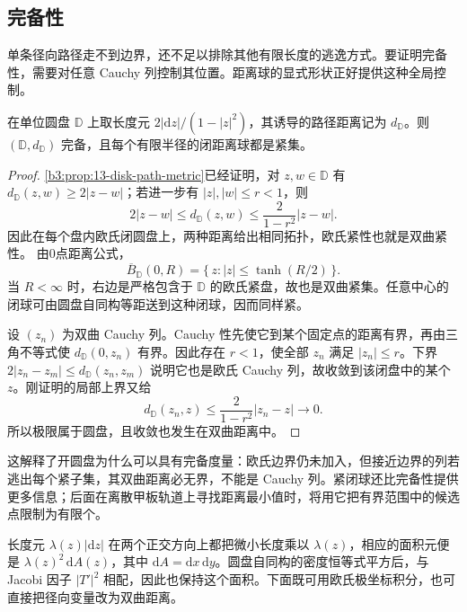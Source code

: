\subsection{完备性}
\label{b3:subsec:130202}

单条径向路径走不到边界，还不足以排除其他有限长度的逃逸方式。要证明完备性，需要对任意 Cauchy 列控制其位置。距离球的显式形状正好提供这种全局控制。

\begin{theorem}[圆盘的完备性与紧闭球]\label{b3:thm:13-disk-complete}
在单位圆盘 \(\mathbb D\) 上取长度元 \(2|\mathrm dz|/(1-|z|^2)\)，其诱导的路径距离记为 \(d_{\mathbb D}\)。则 \((\mathbb D,d_{\mathbb D})\) 完备，且每个有限半径的闭距离球都是紧集。
\end{theorem}
\begin{proof}
\cref{b3:prop:13-disk-path-metric}已经证明，对 \(z,w\in\mathbb D\) 有 \(d_{\mathbb D}(z,w)\ge2|z-w|\)；若进一步有 \(|z|,|w|\le r<1\)，则
\[
 2|z-w|\le d_{\mathbb D}(z,w)
 \le\frac{2}{1-r^2}|z-w|.
\]
因此在每个盘内欧氏闭圆盘上，两种距离给出相同拓扑，欧氏紧性也就是双曲紧性。
由0点距离公式，
\[
 \overline B_{\mathbb D}(0,R)
 =\{\,z:|z|\le\tanh(R/2)\,\}.
\]
当 \(R<\infty\) 时，右边是严格包含于 \(\mathbb D\) 的欧氏紧盘，故也是双曲紧集。任意中心的闭球可由圆盘自同构等距送到这种闭球，因而同样紧。

设 \((z_n)\) 为双曲 Cauchy 列。Cauchy 性先使它到某个固定点的距离有界，再由三角不等式使 \(d_{\mathbb D}(0,z_n)\) 有界。因此存在 \(r<1\)，使全部 \(z_n\) 满足 \(|z_n|\le r\)。下界 \(2|z_n-z_m|\le d_{\mathbb D}(z_n,z_m)\) 说明它也是欧氏 Cauchy 列，故收敛到该闭盘中的某个 \(z\)。刚证明的局部上界又给
\[
 d_{\mathbb D}(z_n,z)\le\frac{2}{1-r^2}|z_n-z|\longrightarrow0.
\]
所以极限属于圆盘，且收敛也发生在双曲距离中。
\end{proof}

这解释了开圆盘为什么可以具有完备度量：欧氏边界仍未加入，但接近边界的列若逃出每个紧子集，其双曲距离必无界，不能是 Cauchy 列。紧闭球还比完备性提供更多信息；后面在离散甲板轨道上寻找距离最小值时，将用它把有界范围中的候选点限制为有限个。

\ProseParagraphBreak
长度元 \(\lambda(z)|\mathrm dz|\) 在两个正交方向上都把微小长度乘以 \(\lambda(z)\)，相应的面积元便是 \(\lambda(z)^2\,\mathrm dA(z)\)，其中 \(\mathrm dA=\mathrm dx\,\mathrm dy\)。圆盘自同构的密度恒等式平方后，与 Jacobi 因子 \(|T'|^2\) 相配，因此也保持这个面积。下面既可用欧氏极坐标积分，也可直接把径向变量改为双曲距离。

